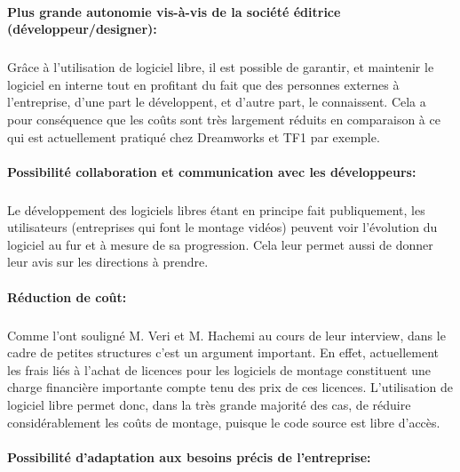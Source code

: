 \begin{itemize}
\paragraph{Plus grande autonomie vis-à-vis de la société éditrice
(développeur/designer):}

  \subparagraph{ }

    Grâce à l'utilisation de logiciel libre, il est possible de
    garantir, et maintenir le logiciel en interne tout en profitant
    du fait que des personnes externes à l'entreprise, d'une part
    le développent, et d'autre part, le connaissent. Cela a pour
    conséquence que les coûts sont très largement réduits en
    comparaison à ce qui est actuellement pratiqué chez Dreamworks et
    TF1 par  exemple.

\paragraph{Possibilité collaboration et communication avec les
développeurs:}

  \subparagraph{}

  Le développement des logiciels libres étant en principe fait
  publiquement, les utilisateurs (entreprises qui font le montage
  vidéos) peuvent voir l'évolution du logiciel au fur et à mesure
  de sa progression. Cela leur permet aussi de donner leur avis sur les
  directions à prendre.

\paragraph{Réduction de coût:}

\subparagraph{}

Comme l'ont souligné  M. Veri et M. Hachemi au cours de leur interview,
dans le cadre de petites structures c'est un argument important.
En effet,  actuellement les frais liés à l'achat de licences pour
les logiciels de montage constituent une charge financière importante
compte tenu des prix de ces licences. L'utilisation de logiciel libre
permet donc, dans la très grande majorité des cas, de réduire
considérablement les coûts de montage, puisque le code source est
libre d'accès.

\paragraph{Possibilité d'adaptation aux besoins précis de l'entreprise:}

\subparagraph{}


\end{itemize}

